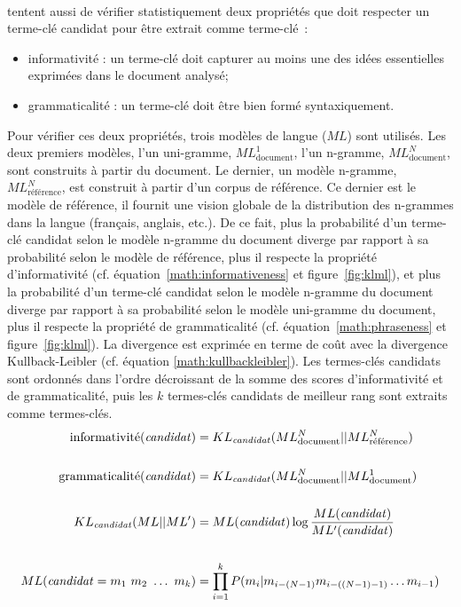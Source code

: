         ~\\ tentent aussi de vérifier
        statistiquement deux propriétés que doit respecter un terme-clé candidat
        pour être extrait comme terme-clé~:
        \begin{itemize}
          \item{informativité : un terme-clé doit capturer au moins une des
                idées essentielles exprimées dans le document analysé;}
          \item{grammaticalité : un terme-clé doit être bien formé
                syntaxiquement.}
        \end{itemize}
        Pour vérifier ces deux propriétés, trois modèles de langue ($ML$) sont
        utilisés. Les deux premiers modèles, l'un uni-gramme,
        $ML_{\text{document}}^1$, l'un n-gramme, $ML_{\text{document}}^N$, sont
        construits à partir du document. Le dernier, un modèle n-gramme,
        $ML_{\text{référence}}^N$, est construit à partir d'un corpus de
        référence. Ce dernier est le modèle de référence, il fournit une vision globale de la
        distribution des n-grammes dans la langue (français, anglais, etc.).
        De ce fait, plus la probabilité d'un terme-clé candidat selon le
        modèle n-gramme du document diverge par rapport à sa probabilité selon
        le modèle de référence, plus il respecte la propriété d'informativité
        (cf. équation~\ref{math:informativeness} et figure~\ref{fig:klml}), et plus la
        probabilité d'un terme-clé candidat selon le modèle n-gramme du
        document diverge par rapport à sa probabilité selon le modèle
        uni-gramme du document, plus il respecte la propriété de
        grammaticalité (cf. équation~\ref{math:phraseness} et figure~\ref{fig:klml}). La divergence est
        exprimée en terme de coût avec la divergence Kullback-Leibler (cf.
        équation \ref{math:kullbackleibler}). Les termes-clés candidats sont
        ordonnés dans l'ordre décroissant de la somme des scores d'informativité
        et de grammaticalité, puis les $k$ termes-clés candidats de meilleur
        rang sont extraits comme termes-clés.
        \begin{align}
          \text{informativité}(\text{\textit{candidat}}) &= KL_{\text{\textit{candidat}}}(ML_{\text{document}}^{N} || ML_{\text{référence}}^{N}) \label{math:informativeness}\\
          \notag\\
          \text{grammaticalité}(\text{\textit{candidat}}) &= KL_{\text{\textit{candidat}}}(ML_{\text{document}}^{N} || ML_{\text{document}}^{1}) \label{math:phraseness}\\
          \notag\\
          KL_{\text{\textit{candidat}}}(ML || ML') &= ML(\text{\textit{candidat}}) \log \frac{ML(\text{\textit{candidat}})}{ML'(\text{\textit{candidat}})} \label{math:kullbackleibler}\\
          \notag\\
          ML(\text{\textit{candidat}} = m_1\ m_2\ \dots\ m_k) &= \prod_{i = 1}^k P(m_i | m_{i - (N - 1)} m_{i - ((N - 1) - 1)} \dots m_{i - 1}) \notag
        \end{align}

